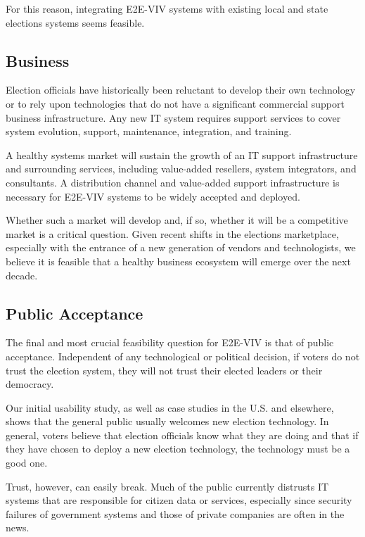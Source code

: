 For this reason, integrating E2E-VIV systems with existing local and
state elections systems seems feasible.

\subsection{Business}
\label{sec:business}

Election officials have historically been reluctant to develop their
own technology or to rely upon technologies that do not have a
significant commercial support business infrastructure. Any new IT
system requires support services to cover system evolution, support,
maintenance, integration, and training.

A healthy systems market will sustain the growth of an IT support
infrastructure and surrounding services, including value-added
resellers, system integrators, and consultants. A distribution channel
and value-added support infrastructure is necessary for E2E-VIV
systems to be widely accepted and deployed.

Whether such a market will develop and, if so, whether it will be a
competitive market is a critical question. Given recent shifts in the
elections marketplace, especially with the entrance of a new
generation of vendors and technologists, we believe it is feasible
that a healthy business ecosystem will emerge over the next decade.

\subsection{Public Acceptance}

The final and most crucial feasibility question for E2E-VIV is that of
public acceptance.  Independent of any technological or political
decision, if voters do not trust the election system, they will not
trust their elected leaders or their democracy.

Our initial usability study, as well as case studies in the U.S. and
elsewhere, shows that the general public usually welcomes new election
technology.  In general, voters believe that election officials know
what they are doing and that if they have chosen to deploy a new
election technology, the technology must be a good one.

Trust, however, can easily break. Much of the public currently
distrusts IT systems that are responsible for citizen data or
services, especially since security failures of government systems and
those of private companies are often in the news.

